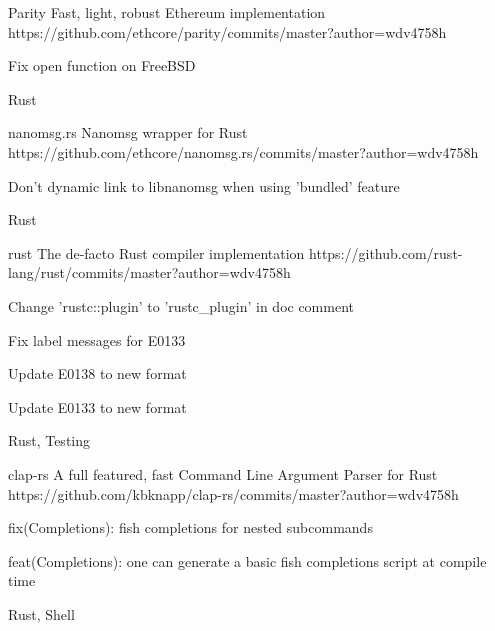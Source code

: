\begin{cvopensources}
  \cvopensource
    {Parity}
    {Fast, light, robust Ethereum implementation}
    {https://github.com/ethcore/parity/commits/master?author=wdv4758h}
    {
      \begin{cvitems}
        \item {Fix open function on FreeBSD}
      \end{cvitems}
    }
    {Rust}

  \cvopensource
    {nanomsg.rs}
    {Nanomsg wrapper for Rust}
    {https://github.com/ethcore/nanomsg.rs/commits/master?author=wdv4758h}
    {
      \begin{cvitems}
        \item {Don't dynamic link to libnanomsg when using 'bundled' feature}
      \end{cvitems}
    }
    {Rust}

  \cvopensource
    {rust}
    {The de-facto Rust compiler implementation}
    {https://github.com/rust-lang/rust/commits/master?author=wdv4758h}
    {
      \begin{cvitems}
        \item {Change 'rustc::plugin' to 'rustc\_plugin' in doc comment}
        \item {Fix label messages for E0133}
        \item {Update E0138 to new format}
        \item {Update E0133 to new format}
      \end{cvitems}
    }
    {Rust, Testing}

  \cvopensource
    {clap-rs}
    {A full featured, fast Command Line Argument Parser for Rust}
    {https://github.com/kbknapp/clap-rs/commits/master?author=wdv4758h}
    {
      \begin{cvitems}   %
        \item {fix(Completions): fish completions for nested subcommands}
        \item {feat(Completions): one can generate a basic fish completions script at compile time}
      \end{cvitems}
    }
    {Rust, Shell}


\end{cvopensources}
